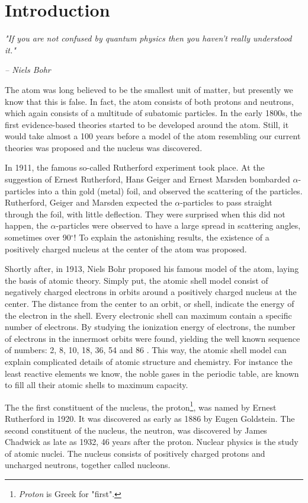 \documentclass[twoside,english]{uiofysmaster/uiofysmaster}
\begin{document}
\chapter{Introduction}
\epigraph{\textit{"If you are not confused by quantum physics then you haven't really understood it."}}{\textit{– Niels Bohr}}


The atom was long believed to be the smallest unit of matter, but presently we know that this is false. 
In fact, the atom consists of both protons and neutrons, which again consists of a multitude of subatomic particles.
In the early 1800s, the first evidence-based theories started to be developed around the atom.
Still, it would take almost a 100 years before a model of the atom resembling our current theories was proposed and the nucleus was discovered. 

In 1911, the famous so-called Rutherford experiment took place.
At the suggestion of Ernest Rutherford, Hans Geiger and Ernest Marsden bombarded $\alpha$-particles into a thin gold (metal) foil, and observed the scattering of the particles.
Rutherford, Geiger and Marsden expected the $\alpha$-particles to pass straight through the foil, with little deflection. 
They were surprised when this did not happen, the $\alpha$-particles were observed to have a large spread in scattering angles, sometimes over 90$^\circ$!
To explain the astonishing results, the existence of a positively charged nucleus at the center of the atom was proposed. 

Shortly after, in 1913, Niels Bohr proposed his famous model of the atom, laying the basis of atomic theory.
Simply put, the atomic shell model consist of negatively charged electrons in orbits around a positively charged nucleus at the center. 
The distance from the center to an orbit, or shell, indicate the energy of the electron in the shell. 
Every electronic shell can maximum contain a specific number of electrons. 
By studying the ionization energy of electrons, the number of electrons in the innermost orbits were found, yielding the well known sequence of numbers: 2, 8, 10, 18, 36, 54 and 86 \cite{Heyde}. 
This way, the atomic shell model can explain complicated details of atomic structure and chemistry. 
For instance the least reactive elements we know, the noble gases in the periodic table, are known to fill all their atomic shells to maximum capacity.

The the first constituent of the nucleus, the proton\footnote{\textit{Proton} is Greek for "first".}, was named by Ernest Rutherford in 1920. It was discovered as early as 1886 by Eugen Goldstein. The second constituent of the nucleus, the neutron, was discovered by James Chadwick as late as 1932, 46 years after the proton.
Nuclear physics is the study of atomic nuclei. 
The nucleus consists of positively charged protons and uncharged neutrons, together called nucleons. 
\end{document}
